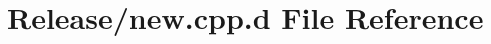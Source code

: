 \hypertarget{_release_2new_8cpp_8d}{\section{\-Release/new.cpp.\-d \-File \-Reference}
\label{_release_2new_8cpp_8d}
}
